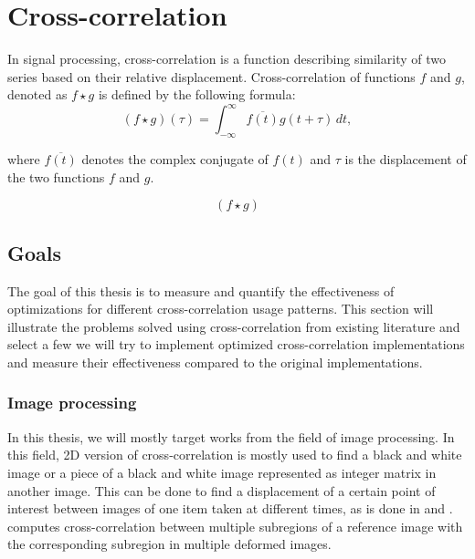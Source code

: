 \chapter*{Cross-correlation}

In signal processing, cross-correlation is a function describing similarity of two series based on their relative displacement. Cross-correlation of functions \(f\) and \(g\), denoted as \(f \star g\) is defined by the following formula:
\[
	(f \star g)(\tau) = \int_{-\infty}^{\infty} \overline{f(t)}g(t + \tau) \,dt,
\] 

where \(\overline{f(t)}\) denotes the complex conjugate of \(f(t)\) and \(\tau\) is the displacement of the two functions \(f\) and \(g\).

\[
	(f \star g)
\]



\section{Goals}

The goal of this thesis is to measure and quantify the effectiveness of optimizations for different cross-correlation usage patterns. This section will illustrate the problems solved using cross-correlation from existing literature and select a few we will try to implement optimized cross-correlation implementations and measure their effectiveness compared to the original implementations.


\subsection{Image processing}

In this thesis, we will mostly target works from the field of image processing. In this field, 2D version of cross-correlation is mostly used to find a  black and white image or a piece of a black and white image represented as integer matrix in another image. This can be done to find a displacement of a certain point of interest between images of one item taken at different times, as is done in \citet{misko} and \citet{zhang2015}. \citet{misko}
computes cross-correlation between multiple subregions of a reference image with the corresponding subregion in multiple deformed images. %


